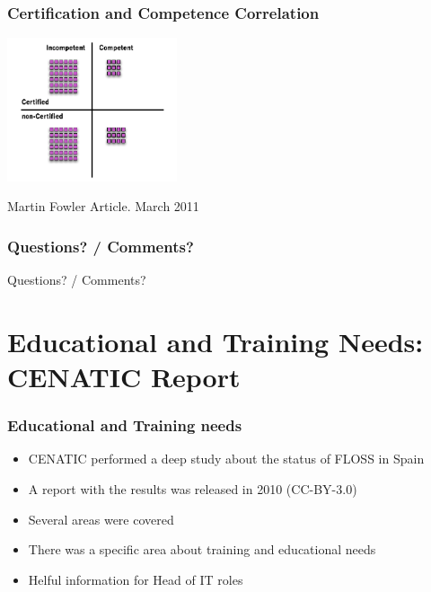 \documentclass{beamer}
\begin{document}

\begin{frame}
\frametitle{Certification and Competence Correlation} 
\begin{center}
  \includegraphics[width=5cm]{figs/CertificationCompetence.png}
\end{center}
\begin{center}
  \small{Martin Fowler Article. March 2011}
\end{center}
\end{frame}





\begin{frame}
\frametitle{Questions? / Comments?}
\begin{center}
\huge{Questions? / Comments?}
\end{center}
\end{frame}


\section{Educational and Training Needs: CENATIC Report}



\begin{frame}
\frametitle{Educational and Training needs}
\begin{itemize}
\item CENATIC performed a deep study about the status of FLOSS in Spain
\item A report with the results was released in 2010 (CC-BY-3.0)
\item Several areas were covered
\item There was a specific area about training and educational needs
\item Helful information for Head of IT roles 
\end{itemize}
\end{frame}
\end{document}
